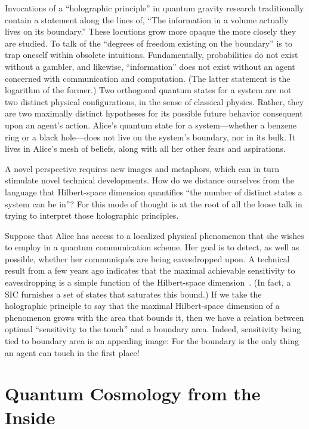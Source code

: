 \documentclass[aps,pra,superscriptaddress,12pt,tightenlines,nofootinbib]{revtex4-2}
\begin{document}
Invocations of a ``holographic principle'' in quantum gravity research
traditionally contain a statement along the lines of, ``The
information in a volume actually lives on its boundary.''  These
locutions grow more opaque the more closely they are studied.  To talk
of the ``degrees of freedom existing on the boundary'' is to trap
oneself within obsolete intuitions.  Fundamentally, probabilities do
not exist without a gambler, and likewise, ``information'' does not
exist without an agent concerned with communication and computation.
(The latter statement is the logarithm of the former.)  Two orthogonal
quantum states for a system are not two distinct physical
configurations, in the sense of classical physics.  Rather, they are
two maximally distinct hypotheses for its possible future behavior
consequent upon an agent's action.  Alice's quantum state for a
system---whether a benzene ring or a black hole---does not live on the system's boundary, nor in its bulk.  It lives in Alice's mesh of beliefs, along with all her other fears and aspirations.

A novel perspective requires new images and metaphors, which can in turn stimulate novel technical developments.  How do we distance ourselves from the language that Hilbert-space dimension quantifies ``the number of distinct states a system can be in''?  For this mode of thought is at the root of all the loose talk in trying to interpret those holographic principles.

Suppose that Alice has access to a localized physical phenomenon that she wishes to employ in a quantum communication scheme.  Her goal is to detect, as well as possible, whether her communiqu\'es are being eavesdropped upon.  A technical result from a few years ago indicates that the maximal achievable sensitivity to eavesdropping is a simple function of the Hilbert-space dimension~\cite{Fuchs03}.  (In fact, a SIC furnishes a set of states that saturates this bound.)  If we take the holographic principle to say that the maximal Hilbert-space dimension of a phenomenon grows with the area that bounds it, then we have a relation between optimal ``sensitivity to the touch'' and a boundary area.  Indeed, sensitivity being tied to boundary area is an appealing image: For the boundary is the only thing an agent can touch in the first place!

\section{Quantum Cosmology from the Inside}
\end{document}
